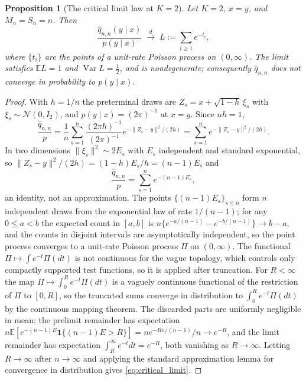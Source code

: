 \documentclass[11pt]{article}
\newtheorem{proposition}[proposition]{Proposition}
\theoremstyle{definition}
\newcommand{\E}{\mathbb{E}}
\newcommand{\Var}{\operatorname{Var}}
\newcommand{\Normal}{\mathcal{N}}
\begin{document}
\begin{proposition}[The critical limit law at $K=2$]\label{prop:critical_limit}
Let $K=2$, $x=y$, and $M_n=S_n=n$. Then
\begin{equation}\label{eq:critical_limit}
\frac{\widehat q_{n,n}(y\mid x)}{p(y\mid x)}\;\xrightarrow{\;d\;}\;L:=\sum_{i\ge1}e^{-t_i},
\end{equation}
where $\{t_i\}$ are the points of a unit-rate Poisson process on $(0,\infty)$. The limit satisfies $\E L=1$ and $\Var L=\tfrac12$, and is nondegenerate; consequently $\widehat q_{n,n}$ does \emph{not} converge in probability to $p(y\mid x)$.
\end{proposition}

\begin{proof}
With $h=1/n$ the preterminal draws are $Z_s=x+\sqrt{1-h}\,\xi_s$ with $\xi_s\sim\Normal(0,I_2)$, and $p(y\mid x)=(2\pi)^{-1}$ at $x=y$. Since $nh=1$,
\[
\frac{\widehat q_{n,n}}{p}=\frac1n\sum_{s=1}^n\frac{(2\pi h)^{-1}}{(2\pi)^{-1}}e^{-\lVert Z_s-y\rVert^2/(2h)}
=\sum_{s=1}^ne^{-\lVert Z_s-y\rVert^2/(2h)} .
\]
In two dimensions $\lVert\xi_s\rVert^2\sim2E_s$ with $E_s$ independent and standard exponential, so $\lVert Z_s-y\rVert^2/(2h)=(1-h)E_s/h=(n-1)E_s$ and
\begin{equation}\label{eq:critical_exponential}
\frac{\widehat q_{n,n}}{p}=\sum_{s=1}^ne^{-(n-1)E_s},
\end{equation}
an identity, not an approximation. The points $\{(n-1)E_s\}_{s\le n}$ form $n$ independent draws from the exponential law of rate $1/(n-1)$; for any $0\le a<b$ the expected count in $[a,b]$ is $n\{e^{-a/(n-1)}-e^{-b/(n-1)}\}\to b-a$, and the counts in disjoint intervals are asymptotically independent, so the point process converges to a unit-rate Poisson process $\Pi$ on $(0,\infty)$. The functional $\Pi\mapsto\int e^{-t}\Pi(dt)$ is not continuous for the vague topology, which controls only compactly supported test functions, so it is applied after truncation. For $R<\infty$ the map $\Pi\mapsto\int_0^Re^{-t}\Pi(dt)$ is a vaguely continuous functional of the restriction of $\Pi$ to $[0,R]$, so the truncated sums converge in distribution to $\int_0^Re^{-t}\Pi(dt)$ by the continuous mapping theorem. The discarded parts are uniformly negligible in mean: the prelimit remainder has expectation $n\E[e^{-(n-1)E}\mathbf{1}\{(n-1)E>R\}]=ne^{-Rn/(n-1)}/n\to e^{-R}$, and the limit remainder has expectation $\int_R^\infty e^{-t}dt=e^{-R}$, both vanishing as $R\to\infty$. Letting $R\to\infty$ after $n\to\infty$ and applying the standard approximation lemma for convergence in distribution gives \eqref{eq:critical_limit}.


\end{proof}
\end{document}
